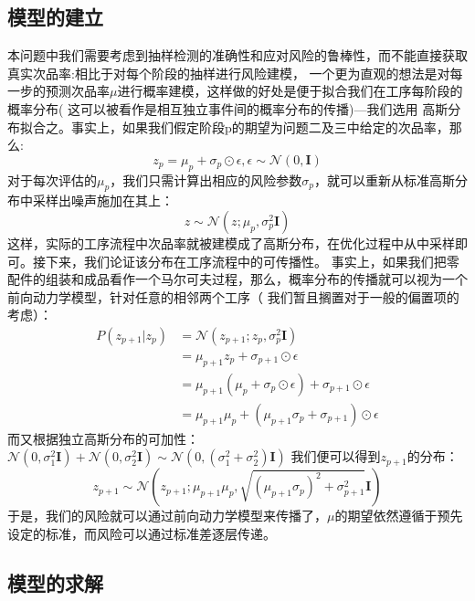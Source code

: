 \documentclass[withoutpreface,bwprint]{cumcmthesis} %
\begin{document}
\subsection{模型的建立}
本问题中我们需要考虑到抽样检测的准确性和应对风险的鲁棒性，而不能直接获取真实次品率:相比于对每个阶段的抽样进行风险建模，
一个更为直观的想法是对每一步的预测次品率$\mu$进行概率建模，这样做的好处是便于拟合我们在工序每阶段的概率分布(
这可以被看作是相互独立事件间的概率分布的传播)---我们选用
高斯分布拟合之。事实上，如果我们假定阶段p的期望为问题二及三中给定的次品率，那么:
\begin{equation}
	z_p = \mu_p + \sigma_p \odot \epsilon, \epsilon \sim \mathcal{N}(0, \mathbf{I})
\end{equation}
对于每次评估的$\mu_p$，我们只需计算出相应的风险参数$\sigma_p$，就可以重新从标准高斯分布中采样出噪声施加在其上：
\begin{equation}
	z \sim \mathcal{N}(z; \mu_p, \sigma_p^2 \mathbf{I})
\end{equation}
这样，实际的工序流程中次品率就被建模成了高斯分布，在优化过程中从中采样即可。接下来，我们论证该分布在工序流程中的可传播性。
事实上，如果我们把零配件的组装和成品看作一个马尔可夫过程，那么，概率分布的传播就可以视为一个前向动力学模型，针对任意的相邻两个工序（
我们暂且搁置对于一般的偏置项的考虑）：
\begin{equation}
	\begin{split}
		P(z_{p+1} | z_p) &= \mathcal{N}(z_{p+1};z_p, \sigma_p^2 \mathbf{I}) \\
		&= \mu_{p+1}z_p + \sigma_{p+1} \odot \epsilon \\
		& = \mu_{p+1}(\mu_p + \sigma_p \odot \epsilon) + \sigma_{p+1} \odot \epsilon \\
		& = \mu_{p+1}\mu_p + (\mu_{p+1}\sigma_p + \sigma_{p+1} )\odot \epsilon
	\end{split}
\end{equation}
而又根据独立高斯分布的可加性：$\mathcal{N}(0, \sigma_1^2 \mathbf{I}) + \mathcal{N}(0, \sigma_2^2 \mathbf{I}) \sim \mathcal{N}(0, (\sigma_1^2 + \sigma_2^2) \mathbf{I})$
我们便可以得到$z_{p+1}$的分布：
\begin{equation}
	z_{p+1} \sim \mathcal{N}(z_{p+1}; \mu_{p+1}\mu_p, \sqrt{(\mu_{p+1}\sigma_p)^2 +\sigma_{p+1}^2}\mathbf{I})
\end{equation}
于是，我们的风险就可以通过前向动力学模型来传播了，$\mu$的期望依然遵循于预先设定的标准，而风险可以通过标准差逐层传递。
\subsection{模型的求解}
\end{document}
